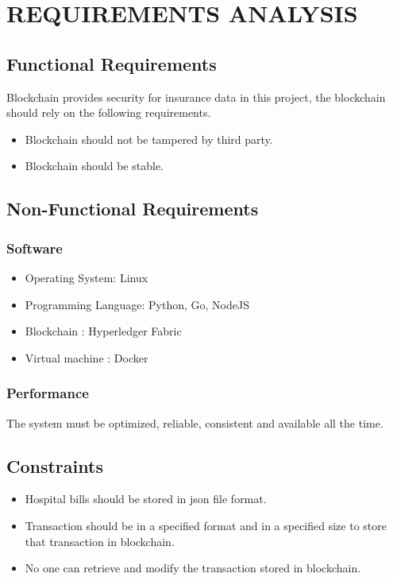 
\chapter{REQUIREMENTS ANALYSIS} %

\section{Functional Requirements}
\lipsum[]
Blockchain provides security for insurance data in this project, the
blockchain should rely on the following requirements.
\begin{itemize}
    \item Blockchain should not be tampered by third party.
    \item Blockchain should be stable.
\end{itemize}

\section{Non-Functional Requirements}
\subsection{Software}
\begin{itemize}
    \item Operating System: Linux
    \item Programming Language: Python, Go, NodeJS 
    \item Blockchain : Hyperledger Fabric
    \item Virtual machine : Docker
\end{itemize}

\subsection{Performance}
\lipsum[]
The system must be optimized, reliable, consistent and available all
the time.
\section{Constraints}
\lipsum[]
\begin{itemize}
    \item Hospital bills should be stored in json file format.
    \item Transaction should be in a specified format and in a specified size to store that transaction in blockchain.
    \item No one can retrieve and modify the transaction stored in
blockchain.

\end{itemize}

